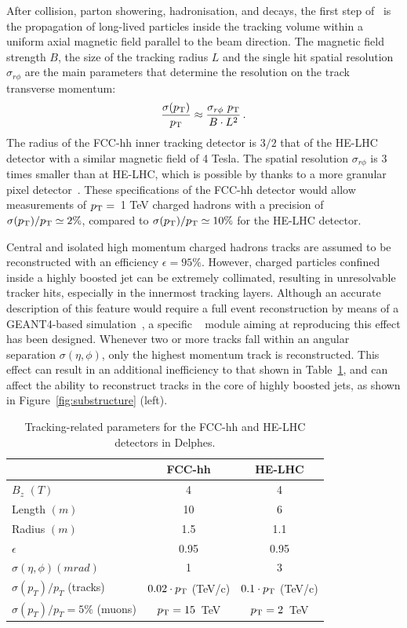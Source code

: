 \documentclass[a4paper,11pt]{article}
\begin{document}
After collision, parton showering, hadronisation, and decays, the first step of \delphes{}~is the propagation of long-lived particles inside the tracking volume within a uniform axial magnetic field parallel to the beam direction. The magnetic field strength $B$, the size of the tracking radius $L$ and the single hit spatial resolution $\sigma_{r\phi}$ are the main parameters that determine the resolution on the track transverse momentum:
\begin{equation}
\frac{\sigma(p_{\text{T}})}{p_{\text{T}}} \approx \frac{\sigma_{r\phi}~ p_{\text{T}}}{B\cdot L^2}\,.
\end{equation}
The radius of the FCC-hh inner tracking detector is $3/2$ that of the HE-LHC detector with a similar magnetic field of 4 Tesla.  The spatial resolution $\sigma_{r\phi}$ is 3 times smaller than at HE-LHC, which is possible by thanks to a more granular pixel detector~\cite{CMS:2012sda}. These specifications of the FCC-hh detector would allow measurements of $p_{\text{T}}=$~1 TeV charged hadrons with a precision of $\sigma(p_{\text{T}})/p_{\text{T}}  \simeq 2\%$, compared to $\sigma(p_{\text{T}})/p_{\text{T}} \simeq 10\%$ for the HE-LHC detector. 

Central and isolated high momentum charged hadrons tracks are assumed to be reconstructed with an efficiency $\epsilon = 95\%$. However, charged particles confined inside a highly boosted jet can be extremely collimated, resulting in unresolvable tracker hits, especially in the innermost tracking layers. Although an accurate description of this feature would require a full event reconstruction by means of a GEANT4-based simulation~\cite{Agostinelli:2002hh,Allison:2006ve,Allison:2016lfl}, a specific \delphes{}~ module aiming at reproducing this effect has been designed. Whenever two or more tracks fall within an angular separation $\sigma(\eta,\phi)$, only the highest momentum track is reconstructed. This effect can result in an additional inefficiency to that shown in Table~\ref{tab:trk_param}, and can affect the ability to reconstruct tracks in the core of highly boosted jets, as shown in Figure~\ref{fig:substructure} (left).

\begin {table}[htb!]
\begin{center}
\begin{tabular}{l||c|c}
& FCC-hh & HE-LHC \\
  \hline
  \hline
$B_z$ $(T)$ &  4 & 4 \\
  \hline
Length $(m)$ & 10 & 6 \\
 \hline
Radius $(m)$ & 1.5 &  1.1 \\
 \hline
$\epsilon$ & 0.95 & 0.95\\
\hline
$\sigma(\eta,\phi) (mrad) $ & 1  & 3  \\
\hline
$\sigma(p_T)/p_T$ (tracks) &  $0.02\cdot p_{\text{T}}$ (TeV/c) &  $0.1\cdot p_{\text{T}}$ (TeV/c)\\
\hline
$\sigma(p_T)/p_T=5\%$ (muons) & $p_{\text{T}}=15$~TeV & $p_{\text{T}}=2$~TeV\\

\end{tabular}
\caption{Tracking-related parameters for the FCC-hh and HE-LHC detectors in Delphes.}
\label{tab:trk_param}
\end{center}
\end{table}
\end{document}
